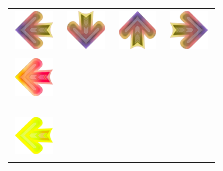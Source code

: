 \begin{center}
	\begin{table}[ht]
		\begin{minipage}{.5\linewidth}
			\centering
			\begin{tabular}[b]{cccc}
				\includegraphics[width=1cm]{figures/receptor/left.png}
				  & \includegraphics[width=1cm]{figures/receptor/down.png}  
				  & \includegraphics[width=1cm]{figures/receptor/up.png}    
				  & \includegraphics[width=1cm]{figures/receptor/right.png} 
				\\
				\includegraphics[width=1cm]{figures/004/left.png}
				  &                                                         
				  &                                                         
				  &                                                         
				\\
				
				  & 

				  &                                                         
				  &                                                         
				\\
				  &                                                         
				  & 

				  &                                                         
				\\
				[-20pt]
				\includegraphics[width=1cm]{figures/016/left.png}
				  &                                                         
				  &                                                         
				  & 


\end{tabular}
\end{minipage}
\end{table}
\end{center}
